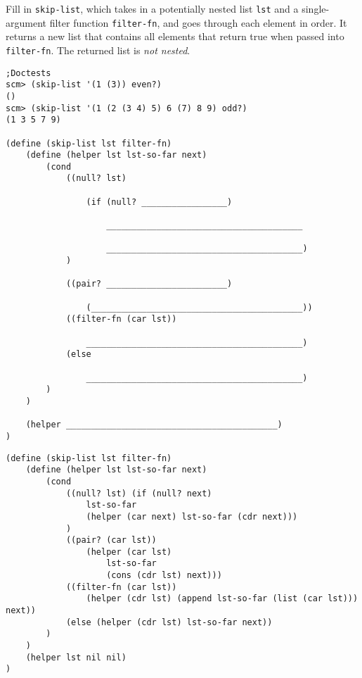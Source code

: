 \question Fill in \lstinline{skip-list}, which takes in a potentially nested list \lstinline{lst} and a single-argument filter function \lstinline{filter-fn}, and goes through each element in order. It returns a new list that contains all elements that return true when passed into \lstinline{filter-fn}. The returned list is \textit{not nested}.

\begin{lstlisting}
;Doctests
scm> (skip-list '(1 (3)) even?)
()
scm> (skip-list '(1 (2 (3 4) 5) 6 (7) 8 9) odd?)
(1 3 5 7 9)

(define (skip-list lst filter-fn) 
    (define (helper lst lst-so-far next)
        (cond
            ((null? lst) 

                (if (null? _________________) 

                    _______________________________________

                    _______________________________________)
            )

            ((pair? ________________________) 

                (__________________________________________))
            ((filter-fn (car lst)) 

                ___________________________________________)
            (else 

                ___________________________________________)
        )
    )

    (helper __________________________________________)
)
\end{lstlisting}

\begin{solution}
\begin{lstlisting}
(define (skip-list lst filter-fn) 
    (define (helper lst lst-so-far next)
        (cond
            ((null? lst) (if (null? next) 
                lst-so-far
                (helper (car next) lst-so-far (cdr next)))
            )
            ((pair? (car lst)) 
                (helper (car lst) 
                    lst-so-far 
                    (cons (cdr lst) next)))
            ((filter-fn (car lst)) 
                (helper (cdr lst) (append lst-so-far (list (car lst))) next))
            (else (helper (cdr lst) lst-so-far next))
        )
    )
    (helper lst nil nil)
)

\end{lstlisting}
\end{solution}